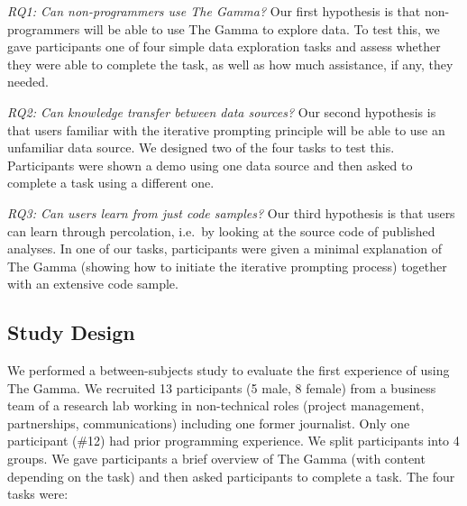 \documentclass[manuscript,review,anonymous]{acmart}
\begin{document}
\vspace{0.5em}\noindent\emph{RQ1: Can non-programmers use The Gamma?}\hspace{0.3em}
Our first hypothesis is that non-programmers will be able to use The Gamma to explore data. To test
this, we gave participants one of four simple data exploration tasks and assess whether they were
able to complete the task, as well as how much assistance, if any, they needed.

\vspace{0.5em}\noindent\emph{RQ2: Can knowledge transfer between data sources?}\hspace{0.3em}
Our second hypothesis is that users familiar with the iterative prompting principle will be able to
use an unfamiliar data source. We designed two of the four tasks to test this. Participants were
shown a demo using one data source and then asked to complete a task using a different one.

\vspace{0.5em}\noindent\emph{RQ3: Can users learn from just code samples?}\hspace{0.3em}
Our third hypothesis is that users can learn through percolation, i.e.~by looking at the source
code of published analyses. In one of our tasks, participants were given a minimal explanation
of The Gamma (showing how to initiate the iterative prompting process) together with
an extensive code sample.

\subsection{Study Design}
We performed a between-subjects study to evaluate the first experience of using The Gamma.
We recruited 13 participants (5 male, 8 female) from a business team
of a research lab working in non-technical roles (project management,
partnerships, communications) including one former journalist. Only one participant (\#12)
had prior programming experience. We split participants into 4 groups. We gave participants a
brief overview of The Gamma (with content depending on the task) and then asked participants
to complete a task. The four tasks were:
\end{document}
